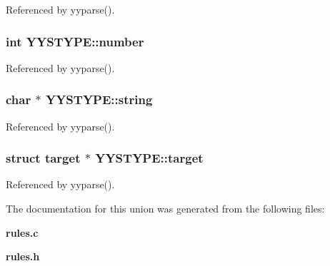Referenced by yyparse().
\subsubsection[{number}]{\setlength{\rightskip}{0pt plus 5cm}int {\bf YYSTYPE::number}}\label{union_y_y_s_t_y_p_e_240bd0051381dcdbd03b9c3764570b93}




Referenced by yyparse().
\subsubsection[{string}]{\setlength{\rightskip}{0pt plus 5cm}char $\ast$ {\bf YYSTYPE::string}}\label{union_y_y_s_t_y_p_e_0138efb4387041e915681aff6dfd68ff}




Referenced by yyparse().
\subsubsection[{target}]{\setlength{\rightskip}{0pt plus 5cm}struct {\bf target} $\ast$ {\bf YYSTYPE::target}\hspace{0.3cm}{\tt  [read]}}\label{union_y_y_s_t_y_p_e_5eff0c65e13afedda0c952322940fd5b}




Referenced by yyparse().

The documentation for this union was generated from the following files:\begin{CompactItemize}
\item 
{\bf rules.c}\item 
{\bf rules.h}\end{CompactItemize}
